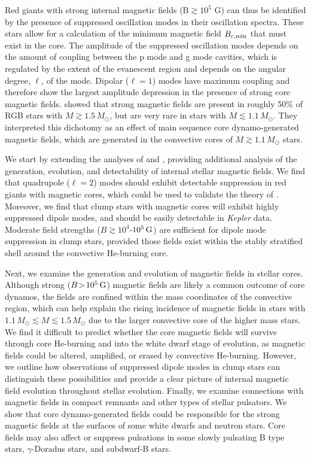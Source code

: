 Red giants with strong internal magnetic fields (B$\gtrsim 10^5$ G) can thus be identified by the presence of suppressed oscillation modes in their oscillation spectra. These stars allow for a calculation of the minimum magnetic field $B_{c,{\rm min}}$ that must exist in the core. The amplitude of the suppressed oscillation modes depends on the amount of coupling between the p mode and g mode cavities, which is regulated by the extent of the evanescent region and depends on the angular degree, $\ell$, of the mode. Dipolar ($\ell=1$) modes have maximum coupling and therefore show the largest amplitude depression in the presence of strong core magnetic fields. \cite{Stello_2016} showed that strong magnetic fields are present in roughly 50\% of RGB stars with $M \gtrsim 1.5 \, M_\odot$, but are very rare in stars with $M \lesssim 1.1 \, M_\odot$. They interpreted this dichotomy as an effect of main sequence core dynamo-generated magnetic fields, which are generated in the convective cores of $M \gtrsim 1.1 \, M_\odot$ stars.

We start by extending the analyses of \citet{Fuller_2015} and \citet{Stello_2016}, providing additional analysis of the generation, evolution, and detectability of internal stellar magnetic fields. We find that quadrupole ($\ell=2$) modes should exhibit detectable suppression in red giants with magnetic cores, which could be used to validate the theory of \cite{Fuller_2015}. Moreover, we find that clump stars with magnetic cores will exhibit highly suppressed dipole modes, and should be easily detectable in {\it Kepler} data. Moderate field strengths ($B \gtrsim 10^4$-$10^5 \, {\rm G}$) are sufficient for dipole mode suppression in clump stars, provided those fields exist within the stably stratified shell around the convective He-burning core.

Next, we examine the generation and evolution of magnetic fields in stellar cores. Although strong ($B \! > \! 10^5 \, {\rm G}$) magnetic fields are likely a common outcome of core dynamos, the fields are confined within the mass coordinates of the convective region, which can help explain the rising incidence of magnetic fields in stars with $1.1 \, M_\odot \! \lesssim \! M \! \lesssim \! 1.5 \, M_\odot$ due to the larger convective core of the higher mass stars. We find it difficult to predict whether the core magnetic fields will survive through core He-burning and into the white dwarf stage of evolution, as magnetic fields could be altered, amplified, or erased by convective He-burning. However, we outline how observations of suppressed dipole modes in clump stars can distinguish these possibilities and provide a clear picture of internal magnetic field evolution throughout stellar evolution. Finally, we examine connections with magnetic fields in compact remnants and other types of stellar pulsators. We show that core dynamo-generated fields could be responsible for the strong magnetic fields at the surfaces of some white dwarfs and neutron stars. Core fields may also affect or suppress pulsations in some slowly pulsating B type stars, $\gamma$-Doradus stars, and subdwarf-B stars. 

